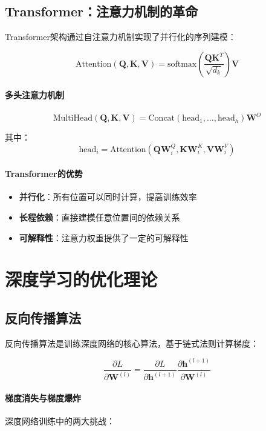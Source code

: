 \subsection{Transformer：注意力机制的革命}

Transformer架构通过自注意力机制实现了并行化的序列建模：

$$\text{Attention}(\mathbf{Q}, \mathbf{K}, \mathbf{V}) = \text{softmax}\left(\frac{\mathbf{Q}\mathbf{K}^T}{\sqrt{d_k}}\right)\mathbf{V}$$

\paragraph{多头注意力机制}
$$\text{MultiHead}(\mathbf{Q}, \mathbf{K}, \mathbf{V}) = \text{Concat}(\text{head}_1, \ldots, \text{head}_h)\mathbf{W}^O$$

其中：
$$\text{head}_i = \text{Attention}(\mathbf{Q}\mathbf{W}_i^Q, \mathbf{K}\mathbf{W}_i^K, \mathbf{V}\mathbf{W}_i^V)$$

\paragraph{Transformer的优势}
\begin{itemize}
\item \textbf{并行化}：所有位置可以同时计算，提高训练效率
\item \textbf{长程依赖}：直接建模任意位置间的依赖关系
\item \textbf{可解释性}：注意力权重提供了一定的可解释性
\end{itemize}

\section{深度学习的优化理论}

\subsection{反向传播算法}

反向传播算法是训练深度网络的核心算法，基于链式法则计算梯度：

$$\frac{\partial L}{\partial \mathbf{W}^{(l)}} = \frac{\partial L}{\partial \mathbf{h}^{(l+1)}} \frac{\partial \mathbf{h}^{(l+1)}}{\partial \mathbf{W}^{(l)}}$$

\paragraph{梯度消失与梯度爆炸}
深度网络训练中的两大挑战：


